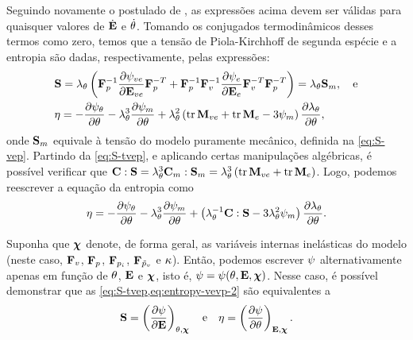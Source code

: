 \documentclass[Tese.tex]{subfiles}
\begin{document}
Seguindo novamente o postulado de , as expressões acima devem ser válidas para quaisquer valores de $\dot{\mathbf{E}}$ e $\dot{\theta}$. Tomando os conjugados termodinâmicos desses termos como zero, temos que a tensão de Piola-Kirchhoff de segunda espécie e a entropia são dadas, respectivamente, pelas expressões:
\begin{align}
& \mathbf{S} = \lambda_{\theta}\left(\mathbf{F}_p^{-1}\dfrac{\partial \psi_{ve}}{\partial \mathbf{E}_{ve}}\mathbf{F}_p^{-T} + \mathbf{F}_p^{-1}\mathbf{F}_v^{-1}\dfrac{\partial \psi_e}{\partial \mathbf{E}_e}\mathbf{F}_v^{-T}\mathbf{F}_p^{-T}\right) = \lambda_{\theta}\mathbf{S}_m, \text{\quad e} \label{eq:S-tvep} \\
& \eta =  - \dfrac{\partial \psi_{\theta}}{\partial \theta} - \lambda_{\theta}^3\dfrac{\partial \psi_m}{\partial \theta} + \lambda_{\theta}^{2}\left(\text{tr}\,\mathbf{M}_{ve} + \text{tr}\,\mathbf{M}_e - 3\psi_m\right)\dfrac{\partial \lambda_{\theta}}{\partial \theta}, \label{eq:entropy-tvep}
\end{align}
onde $\mathbf{S}_m$ equivale à tensão do modelo puramente mecânico, definida na \cref{eq:S-vep}. Partindo da \cref{eq:S-tvep}, e aplicando certas manipulações algébricas, é possível verificar que $\mathbf{C}:\mathbf{S} = \lambda_{\theta}^3\mathbf{C}_m:\mathbf{S}_m = \lambda_{\theta}^3\left(\text{tr}\,\mathbf{M}_{ve} + \text{tr}\,\mathbf{M}_e\right)$. Logo, podemos reescrever a equação da entropia como
\begin{equation}
\eta = - \dfrac{\partial\psi_{\theta}}{\partial\theta} - \lambda_{\theta}^3\dfrac{\partial\psi_m}{\partial\theta} +  \left(\lambda_{\theta}^{-1}\mathbf{C}:\mathbf{S} - 3\lambda_{\theta}^2\psi_m\right)\dfrac{\partial\lambda_{\theta}}{\partial\theta}. \label{eq:entropy-vevp-2}
\end{equation}

Suponha que $\boldsymbol{\chi}$ denote, de forma geral, as variáveis internas inelásticas do modelo (neste caso, $\mathbf{F}_v$, $\mathbf{F}_p$, $\mathbf{F}_{p_i}$, $\mathbf{F}_{\tilde{p}_v}$ e $\kappa$). Então, podemos escrever $\psi$ alternativamente apenas em função de $\theta$, $\mathbf{E}$ e $\boldsymbol{\chi}$, isto é, $\psi = \psi(\theta,\mathbf{E},\boldsymbol{\chi})$. Nesse caso, é possível demonstrar que as \cref{eq:S-tvep,eq:entropy-vevp-2} são equivalentes a
\begin{equation}
\mathbf{S} = \left(\dfrac{\partial\psi}{\partial\mathbf{E}}\right)_{\theta,\boldsymbol{\chi}} \text{\quad e\quad}\eta = \left(\dfrac{\partial\psi}{\partial\theta}\right)_{\mathbf{E},\boldsymbol{\chi}}.
\end{equation}
\end{document}
